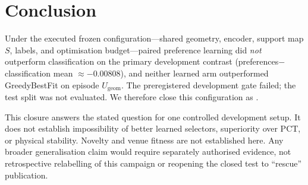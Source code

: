 \section{Conclusion}

Under the executed frozen configuration---shared geometry, encoder, support map
$S$, labels, and optimisation budget---paired preference learning did \emph{not}
outperform classification on the primary development contrast
(preferences$-$classification mean $\approx -0.00808$), and neither learned arm
outperformed GreedyBestFit on episode $U_{\mathrm{geom}}$. The preregistered
development gate failed; the test split was not evaluated. We therefore close
this configuration as .

This closure answers the stated question for one controlled development setup.
It does not establish impossibility of better learned selectors, superiority over
PCT, or physical stability. Novelty and venue fitness are not established here.
Any broader generalisation claim would require separately authorised evidence,
not retrospective relabelling of this campaign or reopening the closed test to
``rescue'' publication.
